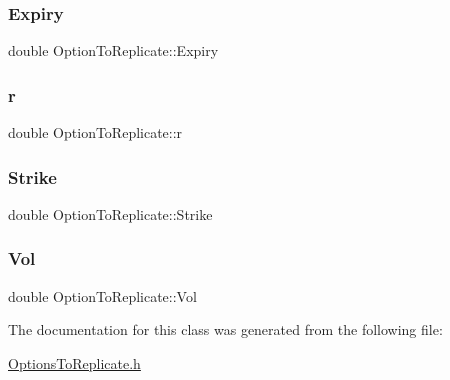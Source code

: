 \hypertarget{classOptionToReplicate_a62014eac88a2a766ed674be69e9fd926}{}\label{classOptionToReplicate_a62014eac88a2a766ed674be69e9fd926} 
\subsubsection{\texorpdfstring{Expiry}{Expiry}}
{\footnotesize\ttfamily double Option\+To\+Replicate\+::\+Expiry\hspace{0.3cm}{\ttfamily [protected]}}

\hypertarget{classOptionToReplicate_ad344ef3a4a4e93372c390c60420d1a61}{}\label{classOptionToReplicate_ad344ef3a4a4e93372c390c60420d1a61} 
\subsubsection{\texorpdfstring{r}{r}}
{\footnotesize\ttfamily double Option\+To\+Replicate\+::r\hspace{0.3cm}{\ttfamily [protected]}}

\hypertarget{classOptionToReplicate_a64ffcbc25fc60c5dc18ca4b78194ca89}{}\label{classOptionToReplicate_a64ffcbc25fc60c5dc18ca4b78194ca89} 
\subsubsection{\texorpdfstring{Strike}{Strike}}
{\footnotesize\ttfamily double Option\+To\+Replicate\+::\+Strike\hspace{0.3cm}{\ttfamily [protected]}}

\hypertarget{classOptionToReplicate_a3a28b1ab0cd1ee635b3c31998bd2c572}{}\label{classOptionToReplicate_a3a28b1ab0cd1ee635b3c31998bd2c572} 
\subsubsection{\texorpdfstring{Vol}{Vol}}
{\footnotesize\ttfamily double Option\+To\+Replicate\+::\+Vol\hspace{0.3cm}{\ttfamily [protected]}}



The documentation for this class was generated from the following file\+:\begin{DoxyCompactItemize}
\item 
\hyperlink{OptionsToReplicate_8h}{Options\+To\+Replicate.\+h}\end{DoxyCompactItemize}
